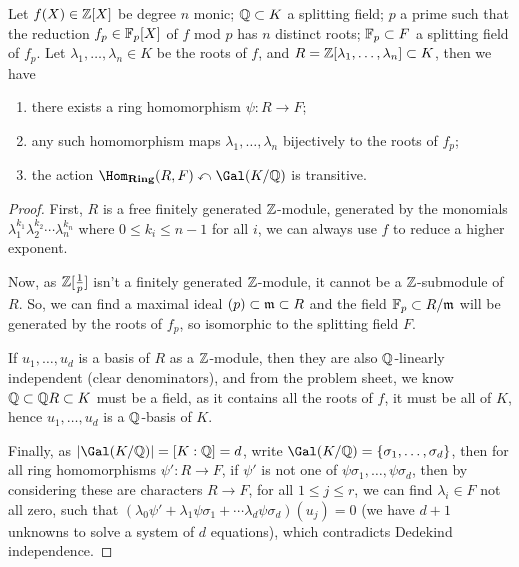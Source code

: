 \documentclass{article}
\begin{document}
\begin{theorem}
    Let $f(X)\in\mathbb{Z}[X]$ be degree $n$ monic; $\mathbb{Q}\subset K$ a splitting field; $p$ a prime such that the reduction $f_p\in\mathbb{F}_p[X]$ of $f$ mod $p$ has $n$ distinct roots; $\mathbb{F}_p\subset F$ a splitting field of $f_p$. Let $\lambda_1,\ldots,\lambda_n\in K$ be the roots of $f$, and $R = \mathbb{Z}[\lambda_1,\ldots,\lambda_n]\subset K$, then we have \begin{enumerate}
        \item there exists a ring homomorphism $\psi:R\rightarrow F$;
        \item any such homomorphism maps $\lambda_1,\ldots,\lambda_n$ bijectively to the roots of $f_p$;
        \item the action $\Hom_{\mathbf{Ring}}(R,F)\curvearrowleft\Gal(K/\bQ)$ is transitive.
    \end{enumerate}
    \begin{proof}
        First, $R$ is a free finitely generated $\mathbb{Z}$-module, generated by the monomials $\lambda_1^{k_1}\lambda_2^{k_2}\cdots\lambda_n^{k_n}$ where $0\leq k_i\leq n-1$ for all $i$, we can always use $f$ to reduce a higher exponent.

        Now, as $\mathbb{Z}[\frac{1}{p}]$ isn't a finitely generated $\mathbb{Z}$-module, it cannot be a $\mathbb{Z}$-submodule of $R$. So, we can find a maximal ideal $(p)\subset \mathfrak{m} \subset R$ and the field $\mathbb{F}_p\subset R/\mathfrak{m}$ will be generated by the roots of $f_p$, so isomorphic to the splitting field $F$.

        If $u_1,\ldots,u_d$ is a basis of $R$ as a $\mathbb{Z}$-module, then they are also $\mathbb{Q}$-linearly independent (clear denominators), and from the problem sheet, we know $\mathbb{Q}\subset \mathbb{Q} R\subset K$ must be a field, as it contains all the roots of $f$, it must be all of $K$, hence $u_1,\ldots,u_d$ is a $\mathbb{Q}$-basis of $K$.

        Finally, as $\abs{\Gal(K/\bQ)} = [K:\bQ] = d$, write $\Gal(K/\bQ) = \{\sigma_1,\ldots,\sigma_d\}$, then for all ring homomorphisms $\psi':R\rightarrow F$, if $\psi'$ is not one of $\psi\sigma_1,\ldots,\psi\sigma_d$, then by considering these are characters $R\rightarrow F$, for all $1\leq j\leq r$, we can find $\lambda_i\in F$ not all zero, such that $(\lambda_0\psi' + \lambda_1\psi\sigma_1 + \cdots \lambda_d\psi\sigma_d)(u_j) = 0$ (we have $d+1$ unknowns to solve a system of $d$ equations), which contradicts Dedekind independence.
    \end{proof}
\end{theorem}
\end{document}
